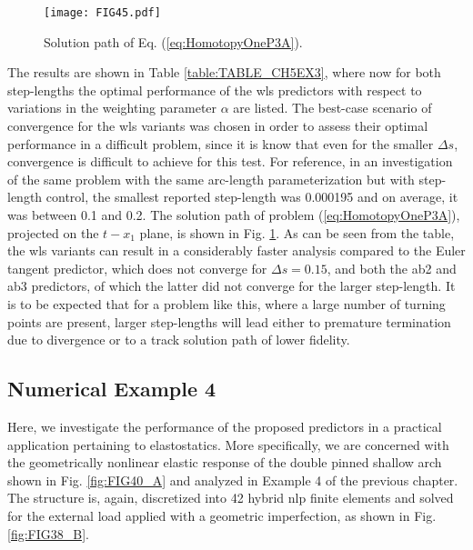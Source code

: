\begin{figure}[b!]
	\centering
	\texttt{[image: FIG45.pdf]}
	\caption{Solution path of Eq. (\ref{eq:HomotopyOneP3A}).}
	\label{fig:FIG45}
\end{figure}

The results are shown in Table \ref{table:TABLE_CH5EX3}, where now for both 
step-lengths
the optimal performance of the \acrshort{wls} predictors with respect to 
variations in 
the weighting parameter $\alpha$ are listed. The best-case scenario of 
convergence for the \acrshort{wls} variants was chosen in order to assess their 
optimal performance in a difficult problem, since it is know that even for the 
smaller $\Delta s$, convergence is difficult to achieve for this test. For 
reference, in an
investigation\cite{Georg81} of the same problem with the same arc-length
parameterization but with step-length control, the smallest reported step-length
was 0.000195 and on average, it was between 0.1 and 0.2. The solution
path of problem (\ref{eq:HomotopyOneP3A}), projected on the $t-x_1$
plane, is shown in Fig. \ref{fig:FIG45}. As can be seen from the table, the 
\acrshort{wls} variants can result in a considerably faster analysis compared 
to the Euler tangent predictor, which does not converge for $\Delta s= 0.15$, 
and both the \acrshort{ab2} and \acrshort{ab3} predictors, of which the latter 
did not converge for the larger step-length. It is to be expected that for a 
problem like this, where a large number of turning points are present, larger 
step-lengths will lead either to premature termination due to divergence or to 
a track solution path of lower fidelity. 


\subsection{Numerical Example 4}
Here, we investigate the performance of the proposed predictors in a
practical application pertaining to elastostatics. More specifically, we are
concerned with the geometrically nonlinear elastic response of the double pinned
shallow arch shown in Fig. \ref{fig:FIG40_A} and analyzed in Example 4 of the 
previous chapter. The structure is, again,
discretized into 42 hybrid \acrshort{nlp} finite elements and solved for the 
external load
applied with a geometric imperfection, as shown in Fig. \ref{fig:FIG38_B}.

%	
%	

